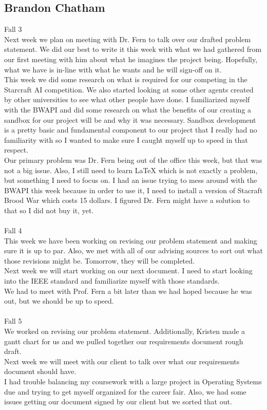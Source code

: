 \subsection{Brandon Chatham}
Fall 3\\
Next week we plan on meeting with Dr. Fern to talk over our drafted problem statement. We did our best to write it this week with what we had gathered from our first meeting with him about what he imagines the project being. Hopefully, what we have is in-line with what he wants and he will sign-off on it.\\ This week we did some research on what is required for our competing in the Starcraft AI competition. We also started looking at some other agents created by other universities to see what other people have done. I familiarized myself with the BWAPI and did some research on what the benefits of our creating a sandbox for our project will be and why it was necessary. Sandbox development is a pretty basic and fundamental component to our project that I really had no familiarity with so I wanted to make sure I caught myself up to speed in that respect.\\ Our primary problem was Dr. Fern being out of the office this week, but that was not a big issue. Also, I still need to learn LaTeX which is not exactly a problem, but something I need to focus on. I had an issue trying to mess around with the BWAPI this week because in order to use it, I need to install a version of Stacraft Brood War which costs 15 dollars. I figured Dr. Fern might have a solution to that so I did not buy it, yet.\\
\\
Fall 4\\
This week we have been working on revising our problem statement and making sure it is up to par. Also, we met with all of our advising sources to sort out what those revisions might be. Tomorrow, they will be completed.\\ Next week we will start working on our next document. I need to start looking into the IEEE standard and familiarize myself with those standards.\\ We had to meet with Prof. Fern a bit later than we had hoped because he was out, but we should be up to speed.\\
\\
Fall 5\\
We worked on revising our problem statement. Additionally, Kristen made a gantt chart for us and we pulled together our requirements document rough draft.\\ Next week we will meet with our client to talk over what our requirements document should have.\\ I had trouble balancing my coursework with a large project in Operating Systems due and trying to get myself organized for the career fair. Also, we had some issues getting our document signed by our client but we sorted that out.\\
